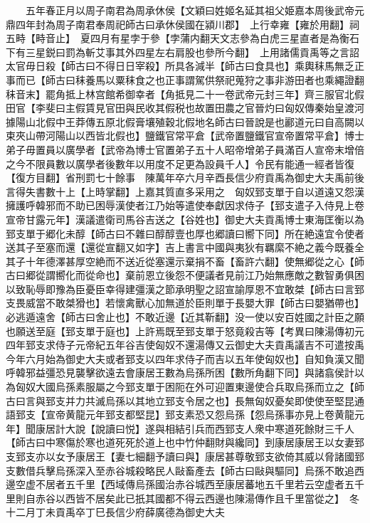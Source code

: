 　　五年春正月以周子南君為周承休侯【文穎曰姓姬名延其祖父姫嘉本周後武帝元鼎四年封為周子南君奉周祀師古曰承休侯國在潁川郡】　上行幸雍【雍於用翻】祠五畤【畤音止】　夏四月有星孛于參【孛蒲内翻天文志參為白虎三星直者是為衡石下有三星鋭曰罰為斬艾事其外四星左右肩股也參所今翻】　上用諸儒貢禹等之言詔太官毋日殺【師古曰不得日日宰殺】所具各減半【師古曰食具也】乘輿秣馬無乏正事而已【師古曰秣養馬以粟秣食之也正事謂駕供祭祀蒐狩之事非游田者也乘繩證翻秣音末】罷角抵上林宫館希御幸者【角抵見二十一卷武帝元封三年】齊三服官北假田官【李斐曰主假賃見官田與民收其假税也故置田農之官晉灼曰匈奴傳秦始皇渡河據陽山北假中王莽傳五原北假膏壤殖穀北假地名師古曰晉說是也酈道元曰自高闕以束夾山帶河陽山以西皆北假也】鹽鐵官常平倉【武帝置鹽鐵官宣帝置常平倉】博士弟子毋置員以廣學者【武帝為博士官置弟子五十人昭帝增弟子員滿百人宣帝末增倍之今不限員數以廣學者後數年以用度不足更為設員千人】令民有能通一經者皆復【復方目翻】省刑罰七十餘事　陳萬年卒六月辛酉長信少府貢禹為御史大夫禹前後言得失書數十上【上時掌翻】上嘉其質直多采用之　匈奴郅支單于自以道遠又怨漢擁護呼韓邪而不助已困辱漢使者江乃始等遣使奉獻因求侍子【郅支遣子入侍見上卷宣帝甘露元年】漢議遣衛司馬谷吉送之【谷姓也】御史大夫貢禹博士東海匡衡以為郅支單于郷化未醇【師古曰不雜曰醇醇壹也厚也郷讀曰嚮下同】所在絶遠宜令使者送其子至塞而還【還從宣翻又如字】吉上書言中國與夷狄有羈縻不絶之義今既養全其子十年德澤甚厚空絶而不送近從塞還示棄捐不畜【畜許六翻】使無郷從之心【師古曰郷從謂嚮化而從命也】棄前恩立後怨不便議者見前江乃始無應敵之數智勇俱困以致恥辱即豫為臣憂臣幸得建彊漢之節承明聖之詔宣諭厚恩不宜敢桀【師古曰言郅支畏威當不敢桀猾也】若懷禽獸心加無道於臣則單于長嬰大罪【師古曰嬰猶帶也】必逃遁遠舍【師古曰舍止也】不敢近邊【近其靳翻】没一使以安百姓國之計臣之願也願送至庭【郅支單于庭也】上許焉既至郅支單于怒竟殺吉等【考異曰陳湯傳初元四年郅支求侍子元帝紀五年谷吉使匈奴不還湯傳又云御史大夫貢禹議吉不可遣按禹今年六月始為御史大夫或者郅支以四年求侍子而吉以五年使匈奴也】自知負漢又聞呼韓邪益彊恐見襲擊欲遠去會康居王數為烏孫所困【數所角翻下同】與諸翕侯計以為匈奴大國烏孫素服屬之今郅支單于困阨在外可迎置東邊使合兵取烏孫而立之【師古曰言與郅支并力共滅烏孫以其地立郅支令居之也】長無匈奴憂矣即使使至堅昆通語郅支【宣帝黄龍元年郅支都堅昆】郅支素恐又怨烏孫【怨烏孫事亦見上卷黄龍元年】聞康居計大說【說讀曰悦】遂與相結引兵而西郅支人衆中寒道死餘財三千人【師古曰中寒傷於寒也道死死於道上也中竹仲翻財與纔同】到康居康居王以女妻郅支郅支亦以女予康居王【妻七細翻予讀曰與】康居甚尊敬郅支欲倚其威以脅諸國郅支數借兵擊烏孫深入至赤谷城殺略民人敺畜產去【師古曰敺與驅同】烏孫不敢追西邊空虚不居者五千里【西域傳烏孫國治赤谷城西至康居蕃地五千里若云空虚者五千里則自赤谷以西皆不居矣此已扺其國都不得云西邊也陳湯傳作且千里當從之】　冬十二月丁未貢禹卒丁巳長信少府薛廣德為御史大夫

